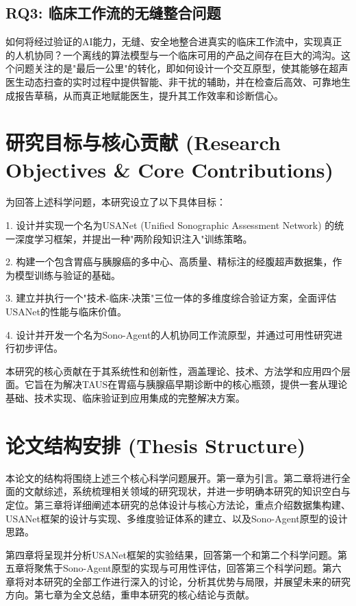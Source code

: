 \subsection{RQ3: 临床工作流的无缝整合问题}

如何将经过验证的AI能力，无缝、安全地整合进真实的临床工作流中，实现真正的人机协同？一个离线的算法模型与一个临床可用的产品之间存在巨大的鸿沟。这个问题关注的是"最后一公里"的转化，即如何设计一个交互原型，使其能够在超声医生动态扫查的实时过程中提供智能、非干扰的辅助，并在检查后高效、可靠地生成报告草稿，从而真正地赋能医生，提升其工作效率和诊断信心。

\section{研究目标与核心贡献 (Research Objectives \& Core Contributions)}

为回答上述科学问题，本研究设立了以下具体目标：

1. 设计并实现一个名为USANet (Unified Sonographic Assessment Network) 的统一深度学习框架，并提出一种"两阶段知识注入"训练策略。

2. 构建一个包含胃癌与胰腺癌的多中心、高质量、精标注的经腹超声数据集，作为模型训练与验证的基础。

3. 建立并执行一个"技术-临床-决策"三位一体的多维度综合验证方案，全面评估USANet的性能与临床价值。

4. 设计并开发一个名为Sono-Agent的人机协同工作流原型，并通过可用性研究进行初步评估。

本研究的核心贡献在于其系统性和创新性，涵盖理论、技术、方法学和应用四个层面。它旨在为解决TAUS在胃癌与胰腺癌早期诊断中的核心瓶颈，提供一套从理论基础、技术实现、临床验证到应用集成的完整解决方案。

\section{论文结构安排 (Thesis Structure)}

本论文的结构将围绕上述三个核心科学问题展开。第一章为引言。第二章将进行全面的文献综述，系统梳理相关领域的研究现状，并进一步明确本研究的知识空白与定位。第三章将详细阐述本研究的总体设计与核心方法论，重点介绍数据集构建、USANet框架的设计与实现、多维度验证体系的建立、以及Sono-Agent原型的设计思路。

第四章将呈现并分析USANet框架的实验结果，回答第一个和第二个科学问题。第五章将聚焦于Sono-Agent原型的实现与可用性评估，回答第三个科学问题。第六章将对本研究的全部工作进行深入的讨论，分析其优势与局限，并展望未来的研究方向。第七章为全文总结，重申本研究的核心结论与贡献。
